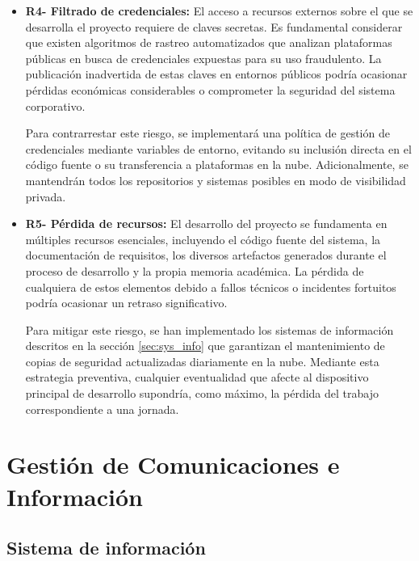\begin{itemize}
\item\textbf{R4- Filtrado de credenciales: }El acceso a recursos externos sobre el que se desarrolla el proyecto requiere de claves secretas. Es fundamental considerar que existen algoritmos de rastreo automatizados que analizan plataformas públicas en busca de credenciales expuestas para su uso fraudulento. La publicación inadvertida de estas claves en entornos públicos podría ocasionar pérdidas económicas considerables o comprometer la seguridad del sistema corporativo.

Para contrarrestar este riesgo, se implementará una política de gestión de credenciales mediante variables de entorno, evitando su inclusión directa en el código fuente o su transferencia a plataformas en la nube. Adicionalmente, se mantendrán todos los repositorios y sistemas posibles en modo de visibilidad privada.

\item\textbf{R5- Pérdida de recursos: }El desarrollo del proyecto se fundamenta en múltiples recursos esenciales, incluyendo el código fuente del sistema, la documentación de requisitos, los diversos artefactos generados durante el proceso de desarrollo y la propia memoria académica. La pérdida de cualquiera de estos elementos debido a fallos técnicos o incidentes fortuitos podría ocasionar un retraso significativo.

Para mitigar este riesgo, se han implementado los sistemas de información descritos en la sección \ref{sec:sys_info} que garantizan el mantenimiento de copias de seguridad actualizadas diariamente en la nube. Mediante esta estrategia preventiva, cualquier eventualidad que afecte al dispositivo principal de desarrollo supondría, como máximo, la pérdida del trabajo correspondiente a una jornada.
\end{itemize}

\section{Gestión de Comunicaciones e Información}

\subsection{Sistema de información}\label{sec}

